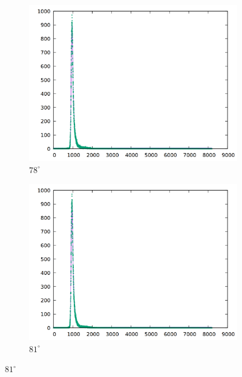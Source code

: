 \begin{figure}[h]
\begin{subfigure}[h]{0.49\textwidth}
    \includegraphics[width=\textwidth]{data/temp/na_78.png}
    \caption{$78^\circ$}
  \end{subfigure}
  \begin{subfigure}[h]{0.49\textwidth}
    \centering
    \includegraphics[width=\textwidth]{data/temp/na_81.png}
    \caption{$81^\circ$}
  \end{subfigure}
  \end{figure}
